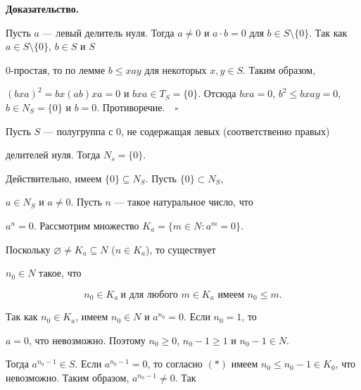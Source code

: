  


{\bf Доказательство.} 


Пусть $a$ --- левый делитель нуля. Тогда $a\ne0$ и $a\cdot b=0$ для $b\in 


S\setminus\{0\}$. Так как $a\in S\setminus\{0\}$, $b\in S$ и $S$ \ 


0-простая, то по лемме $b\le xay$ для некоторых $x,y\in S$. Таким образом,


$(bxa)^2=bx(ab)xa=0$ и $bxa\in T_S=\{0\}$. Отсюда $bxa=0$, $b^2\le 


bxay=0$, $b\in N_S=\{0\}$ и $b=0$. Противоречие.$\quad\square$ 


 


\begin{note} 


Пусть $S$ --- полугруппа с 0, не содержащая левых (соответственно правых) 


делителей нуля. Тогда $N_s=\{0\}$. 


\end{note} 


 


Действительно, имеем $\{0\}\subseteq N_S$. Пусть $\{0\}\subset N_S$, 


$a\in N_S$ и $a\ne0$. Пусть $n$ --- такое натуральное число, что 


$a^n=0$. Рассмотрим множество $K_a=\{m\in N:a^m=0\}$. 


 


Поскольку $\varnothing\ne K_a\subseteq N$ ($n\in K_a$), то существует 


$n_0\in N$ такое, что 


\begin{equation} 


n_0\in K_a 


\ \text{и для любого $m\in K_a$ имеем $n_0\le m$}. 


\tag{$\ast$} 


\end{equation} 


Так как $n_0\in K_a$, имеем $n_0\in N$ и $a^{n_0}=0$. Если $n_0=1$, то 


$a=0$, что невозможно. Поэтому $n_0\ge0$, $n_0-1\ge1$ и $n_0-1\in N$. 


Тогда $a^{n_0-1}\in S$. Если $a^{n_0-1}=0$, то согласно $(*)$ имеем $n_0\le 


n_0-1\in K_0$, что невозможно. Таким образом, $a^{n_0-1}\ne0$. Так 


